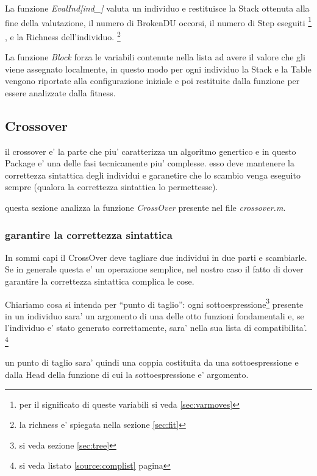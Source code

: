 \documentclass[12pt, a4paper]{article}
\begin{document}
La funzione {\itshape EvalInd[ind\_]} valuta un individuo e restituisce la Stack ottenuta alla fine della valutazione, il numero di BrokenDU occorsi, il numero di Step eseguiti
\footnote{ per il significato di queste variabili si veda \ref{sec:varmoves}}
, e la Richness dell'individuo.
\footnote{la richness e' spiegata nella sezione \ref{sec:fit}}

La funzione {\itshape Block} forza le variabili contenute nella lista ad avere il valore che gli viene assegnato localmente, in questo modo per ogni individuo la Stack e la Table vengono riportate alla configurazione iniziale e poi restituite dalla funzione per essere analizzate dalla fitness.

\lstset{caption=funzione che valuta un individuo , label=source:EvalInd}




\subsection{Crossover}
il crossover e' la parte che piu' caratterizza un algoritmo genertico e in questo Package e' una delle fasi tecnicamente piu' complesse.
esso deve mantenere la correttezza sintattica degli individui e garanetire che lo scambio venga eseguito sempre (qualora la correttezza sintattica lo permettesse).

questa sezione analizza la funzione {\itshape CrossOver} presente nel file {\itshape crossover.m}.

\subsubsection{garantire la correttezza sintattica}
In sommi capi il CrossOver deve tagliare due individui in due parti e scambiarle. Se in generale questa e' un operazione semplice, nel nostro caso il fatto di dover garantire la correttezza sintattica complica le cose. 

Chiariamo cosa si intenda per ``punto di taglio'': ogni sottoespressione\footnote{si veda sezione \ref{sec:tree}} presente in un individuo sara' un argomento di una delle otto funzioni fondamentali e, se l'individuo e' stato generato correttamente, sara' nella sua lista di compatibilita'.
\footnote{si veda listato \ref{source:complist} pagina \pageref{source:complist}} 

un punto di taglio sara' quindi una coppia costituita da una sottoespressione e dalla Head della funzione di cui la sottoespressione e' argomento.
\end{document}
